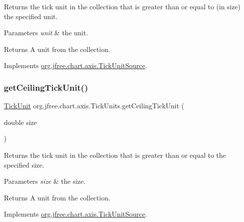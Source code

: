 Returns the tick unit in the collection that is greater than or equal to (in size) the specified unit.


\begin{DoxyParams}{Parameters}
{\em unit} & the unit.\\
\hline
\end{DoxyParams}
\begin{DoxyReturn}{Returns}
A unit from the collection. 
\end{DoxyReturn}


Implements \mbox{\hyperlink{interfaceorg_1_1jfree_1_1chart_1_1axis_1_1_tick_unit_source_a38db8c401c916244f48a758a8e8d469f}{org.\+jfree.\+chart.\+axis.\+Tick\+Unit\+Source}}.

\mbox{\label{classorg_1_1jfree_1_1chart_1_1axis_1_1_tick_units_ac65181d78c8783d8094d8b28273c37da}} 
\subsubsection{\texorpdfstring{get\+Ceiling\+Tick\+Unit()}{getCeilingTickUnit()}\hspace{0.1cm}{\footnotesize\ttfamily [2/2]}}
{\footnotesize\ttfamily \mbox{\hyperlink{classorg_1_1jfree_1_1chart_1_1axis_1_1_tick_unit}{Tick\+Unit}} org.\+jfree.\+chart.\+axis.\+Tick\+Units.\+get\+Ceiling\+Tick\+Unit (\begin{DoxyParamCaption}\item[{double}]{size }\end{DoxyParamCaption})}

Returns the tick unit in the collection that is greater than or equal to the specified size.


\begin{DoxyParams}{Parameters}
{\em size} & the size.\\
\hline
\end{DoxyParams}
\begin{DoxyReturn}{Returns}
A unit from the collection. 
\end{DoxyReturn}


Implements \mbox{\hyperlink{interfaceorg_1_1jfree_1_1chart_1_1axis_1_1_tick_unit_source_a875d23e3610749f233950f61a855360d}{org.\+jfree.\+chart.\+axis.\+Tick\+Unit\+Source}}.


